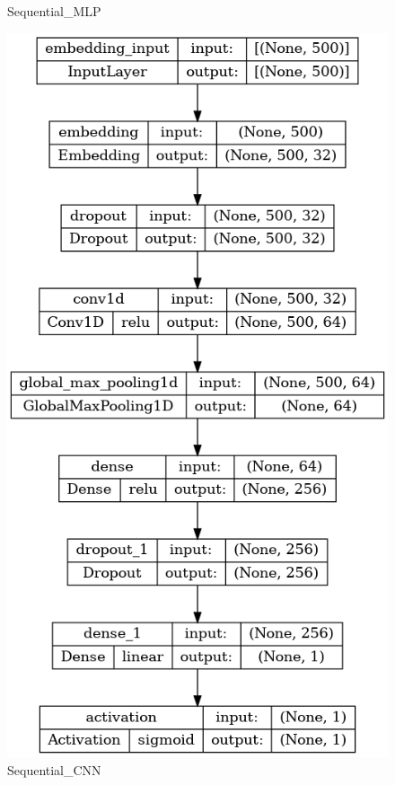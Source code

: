 \begin{figure}[!hb]
\begin{minipage}{0.5\textwidth}
        \caption{Sequential\_MLP}
    \end{minipage}\hfill
    \begin{minipage}{0.5\textwidth}
        \centering
        \includegraphics[width=\linewidth]{obrazky-figures/model-plots/Sequential_CNN.png} %
        \caption{Sequential\_CNN}
    \end{minipage}
\end{figure}
